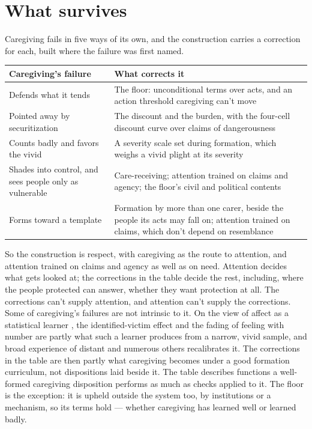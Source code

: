 \section{What survives}
\label{sec:20.12}
Caregiving fails in five ways of its own, and the construction carries a correction for each, built where the failure was first named.

\begingroup\small\renewcommand{\arraystretch}{1.12}
\begin{longtable}{@{}>{\raggedright\arraybackslash}p{}>{\raggedright\arraybackslash}p{}@{}}
\hline
\textbf{Caregiving's failure} & \textbf{What corrects it} \\
\hline
\endhead
Defends what it tends & The floor: unconditional terms over acts, and an action threshold caregiving can't move \\ \hline
Pointed away by securitization & The discount and the burden, with the four-cell discount curve over claims of dangerousness \\ \hline
Counts badly and favors the vivid & A severity scale set during formation, which weighs a vivid plight at its severity \\ \hline
Shades into control, and sees people only as vulnerable & Care-receiving; attention trained on claims and agency; the floor's civil and political contents \\ \hline
Forms toward a template & Formation by more than one carer, beside the people its acts may fall on; attention trained on claims, which don't depend on resemblance \\ \hline
\end{longtable}
\endgroup

So the construction is respect, with caregiving as the route to attention, and attention trained on claims and agency as well as on need. Attention decides what gets looked at; the corrections in the table decide the rest, including, where the people protected can answer, whether they want protection at all. The corrections can't supply attention, and attention can't supply the corrections. Some of caregiving's failures are not intrinsic to it. On the view of affect as a statistical learner \autocite{railton2014affective}, the identified-victim effect and the fading of feeling with number are partly what such a learner produces from a narrow, vivid sample, and broad experience of distant and numerous others recalibrates it. The corrections in the table are then partly what caregiving becomes under a good formation curriculum, not dispositions laid beside it. The table describes functions a well-formed caregiving disposition performs as much as checks applied to it. The floor is the exception: it is upheld outside the system too, by institutions or a mechanism, so its terms hold — whether caregiving has learned well or learned badly.

